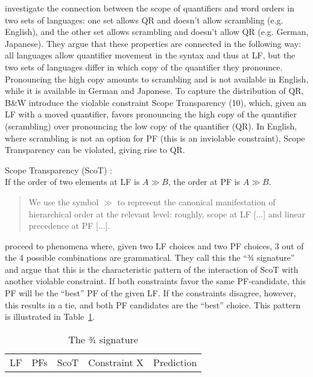 \documentclass[output=paper,colorlinks,citecolor=brown,
]{langscibook}
\begin{document}
\citet{Bobaljik.Wurmbrand.2012} investigate the connection between the
scope of quantifiers and word orders in two sets of languages: one set
allows QR and doesn’t allow scrambling (e.g. English), and the other
set allows scrambling and doesn’t allow QR (e.g. German, Japanese).
They argue that these properties are connected in the following way:
all languages allow quantifier movement in the syntax and thus at LF,
but the two sets of languages differ in which copy of the quantifier
they pronounce. Pronouncing the high copy amounts to scrambling
and is not available in English, while it is available in German and
Japanese. To capture the distribution of QR, B\&W introduce the
violable constraint Scope Transparency (10), which, given an LF with
a moved quantifier, favors pronouncing the high copy of the quantifier
(scrambling) over pronouncing the low copy of the quantifier (QR). In
English, where scrambling is not an option for PF (this is an inviolable
constraint), Scope Transparency can be violated, giving rise to QR.

\ea
    Scope Transparency (ScoT) \citep[]{Bobaljik.Wurmbrand.2012}: \\
    If the order of two elements at LF is $A\gg B$, the order at PF is $A\gg B$. \\
    \begin{quote}
    We use the symbol $\gg$ to represent the canonical manifestation
    of hierarchical order at the relevant level: roughly, scope at LF
    [...] and linear precedence at PF [...]. 
    \end{quote}
\z 

\citet{Bobaljik.Wurmbrand.2012} proceed to phenomena where, given
two LF choices and two PF choices, 3 out of the 4 possible
combinations are grammatical. They call this the “3⁄4 signature” and
argue that this is the characteristic pattern of the interaction of ScoT
with another violable constraint. If both constraints favor the same
PF-candidate, this PF will be the “best” PF of the given LF. If the
constraints disagree, however, this results in a tie, and both PF
candidates are the “best” choice. This pattern is illustrated in Table~\ref{lasz:tab:4}.

\begin{table}[
]
    \centering
    \begin{tabular}{ccccc}
        LF & PFs & ScoT & Constraint X & Prediction \\
    \end{tabular}
    \caption{The 3⁄4 signature \citep[f.]{Bobaljik.Wurmbrand.2012}}
    \label{lasz:tab:4}
\end{table}

\printbibliography[heading=subbibliography,notkeyword=this]
\end{document}

